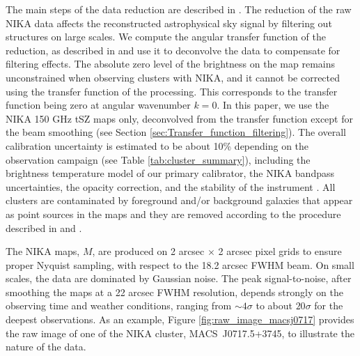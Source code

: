 \documentclass[twocolumn,traditabstract]{aa}
\begin{document}
The main steps of the data reduction are described in \cite{Adam2014,Adam2015}. The reduction of the raw NIKA data affects the reconstructed astrophysical sky signal by filtering out structures on large scales. We compute the angular transfer function of the reduction, as described in \cite{Adam2015} and use it to deconvolve the data to compensate for filtering effects. The absolute zero level of the brightness on the map remains unconstrained when observing clusters with NIKA, and it cannot be corrected using the transfer function of the processing. This corresponds to the transfer function being zero at angular wavenumber $k = 0$. In this paper, we use the NIKA 150 GHz tSZ maps only, deconvolved from the transfer function except for the beam smoothing (see Section \ref{sec:Transfer_function_filtering}). The overall calibration uncertainty is estimated to be about 10\% depending on the observation campaign (see Table \ref{tab:cluster_summary}), including the brightness temperature model of our primary calibrator, the NIKA bandpass uncertainties, the opacity correction, and the stability of the instrument \citep{Catalano2014}. All clusters are contaminated by foreground and/or background galaxies that appear as point sources in the maps and they are removed according to the procedure described in \cite{Adam2015} and \cite{Adam2016a}. 

The NIKA maps, $M$, are produced on 2 arcsec $\times$ 2 arcsec pixel grids to ensure proper Nyquist sampling, with respect to the 18.2 arcsec FWHM beam. On small scales, the data are dominated by Gaussian noise. The peak signal-to-noise, after smoothing the maps at a 22 arcsec FWHM resolution, depends strongly on the observing time and weather conditions, ranging from $\sim 4 \sigma$ to about $20 \sigma$ for the deepest observations. As an example, Figure \ref{fig:raw_image_macsj0717} provides the raw image of one of the NIKA cluster, \mbox{MACS~J0717.5+3745}, to illustrate the nature of the data.
\end{document}
